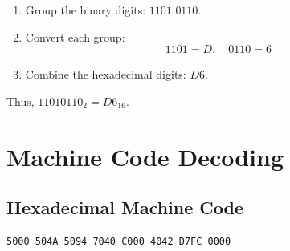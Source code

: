 \documentclass{report}
\begin{document}
\begin{enumerate}
	\item Group the binary digits: \(1101\) \(0110\).
	\item Convert each group:
	      \[
		      1101 = D, \quad 0110 = 6
	      \]
	\item Combine the hexadecimal digits: \(D6\).
\end{enumerate}

Thus, \(11010110_2 = D6_{16}\).

\section{Machine Code Decoding}

\subsection{Hexadecimal Machine Code}
\begin{verbatim}
5000 504A 5094 7040 C000 4042 D7FC 0000
\end{verbatim}
\end{document}
